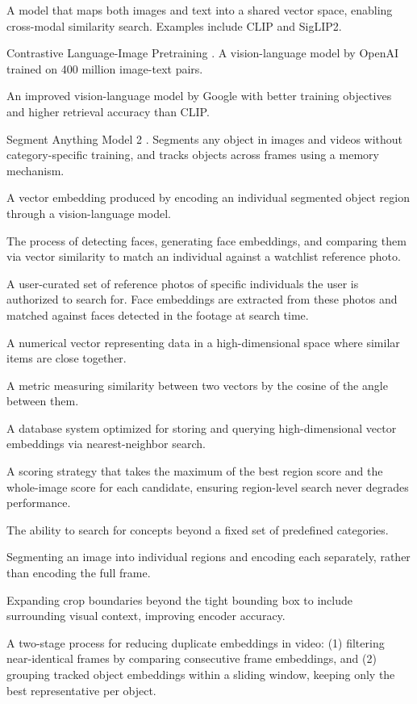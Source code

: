 \begin{description}[style=nextline, leftmargin=2cm]
    \item[Vision-Language Model] A model that maps both images and text into a shared vector space, enabling cross-modal similarity search. Examples include CLIP and SigLIP2.
    \item[CLIP] Contrastive Language-Image Pretraining \cite{radford2021learning}. A vision-language model by OpenAI trained on 400 million image-text pairs.
    \item[SigLIP2] An improved vision-language model by Google \cite{zhai2025siglip2} with better training objectives and higher retrieval accuracy than CLIP.
    \item[SAM 2] Segment Anything Model 2 \cite{ravi2024sam2}. Segments any object in images and videos without category-specific training, and tracks objects across frames using a memory mechanism.
    \item[Object Region Embedding] A vector embedding produced by encoding an individual segmented object region through a vision-language model.
    \item[Face Matching] The process of detecting faces, generating face embeddings, and comparing them via vector similarity to match an individual against a watchlist reference photo.
    \item[Watchlist] A user-curated set of reference photos of specific individuals the user is authorized to search for. Face embeddings are extracted from these photos and matched against faces detected in the footage at search time.
    \item[Embedding] A numerical vector representing data in a high-dimensional space where similar items are close together.
    \item[Cosine Similarity] A metric measuring similarity between two vectors by the cosine of the angle between them.
    \item[Vector Database] A database system optimized for storing and querying high-dimensional vector embeddings via nearest-neighbor search.
    \item[Hybrid Scoring] A scoring strategy that takes the maximum of the best region score and the whole-image score for each candidate, ensuring region-level search never degrades performance.
    \item[Open Vocabulary] The ability to search for concepts beyond a fixed set of predefined categories.
    \item[Region-Level Search] Segmenting an image into individual regions and encoding each separately, rather than encoding the full frame.
    \item[Context Padding] Expanding crop boundaries beyond the tight bounding box to include surrounding visual context, improving encoder accuracy.
    \item[Rule-Based Deduplication] A two-stage process for reducing duplicate embeddings in video: (1) filtering near-identical frames by comparing consecutive frame embeddings, and (2) grouping tracked object embeddings within a sliding window, keeping only the best representative per object.
\end{description}

